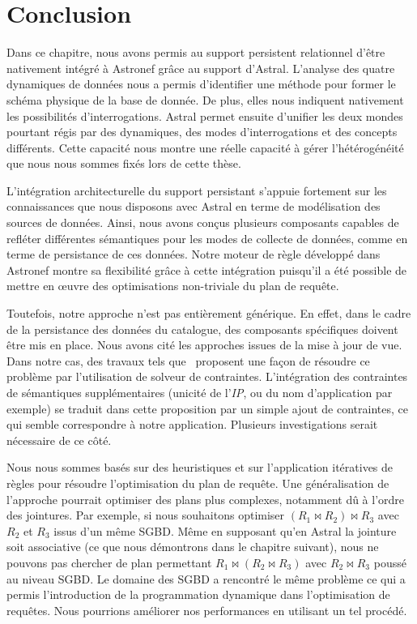 \section{Conclusion}\label{sec:contrib:asteroid:conclusion}
Dans ce chapitre, nous avons permis au support persistent relationnel d'être nativement intégré à Astronef grâce au support d'Astral. L'analyse des quatre dynamiques de données nous a permis d'identifier une méthode pour former le schéma physique de la base de donnée. De plus, elles nous indiquent nativement les possibilités d'interrogations.  Astral permet ensuite d'unifier les deux mondes pourtant régis par des dynamiques, des modes d'interrogations et des concepts différents. Cette capacité nous montre une réelle capacité à gérer l'hétérogénéité que nous nous sommes fixés lors de cette thèse.

L'intégration architecturelle du support persistant s'appuie fortement sur les connaissances que nous disposons avec Astral en terme de modélisation des sources de données. Ainsi, nous avons conçus plusieurs composants capables de refléter différentes sémantiques pour les modes de collecte de données, comme en terme de persistance de ces données. Notre moteur de règle développé dans Astronef montre sa flexibilité grâce à cette intégration puisqu'il a été possible de mettre en œuvre des optimisations non-triviale du plan de requête.

Toutefois, notre approche n'est pas entièrement générique. En effet, dans le cadre de la persistance des données du catalogue, des composants spécifiques doivent être mis en place. Nous avons cité les approches issues de la mise à jour de vue. Dans notre cas, des travaux tels que~\cite{Shu:viewupdate} proposent une façon de résoudre ce problème par l'utilisation de solveur de contraintes. L'intégration des contraintes de sémantiques supplémentaires (unicité de l'\textit{IP}, ou du nom d'application par exemple) se traduit dans cette proposition par un simple ajout de contraintes, ce qui semble correspondre à notre application. Plusieurs investigations serait nécessaire de ce côté.

Nous nous sommes basés sur des heuristiques et sur l'application itératives de règles pour résoudre l'optimisation du plan de requête. Une généralisation de l'approche pourrait optimiser des plans plus complexes, notamment dû à l'ordre des jointures. Par exemple, si nous souhaitons optimiser $(R_1 \Join R_2) \Join R_3$ avec $R_2$ et $R_3$ issus d'un même SGBD. Même en supposant qu'en Astral la jointure soit associative (ce que nous démontrons dans le chapitre suivant), nous ne pouvons pas chercher de plan permettant $R_1 \Join (R_2 \Join R_3)$ avec $R_2\Join R_3$ poussé au niveau SGBD. Le domaine des SGBD a rencontré le même problème ce qui a permis l'introduction de la programmation dynamique dans l'optimisation de requêtes. Nous pourrions améliorer nos performances en utilisant un tel procédé.